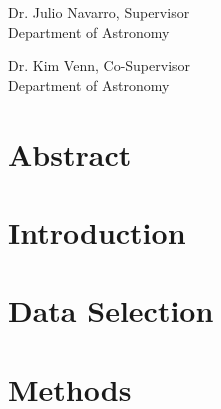 \documentclass[12pt,oneside,letterpaper]{report}
\newcommand{\skipline}{\vspace{\baselineskip}}
\begin{document}
Dr. Julio Navarro, Supervisor\\
Department of Astronomy \\
\skipline

\noindent Dr. Kim Venn, Co-Supervisor\\
Department of Astronomy


\chapter*{Abstract}


% 


\tableofcontents
\listoffigures
\listoftables

%
%
%
%
%
%
%
%
\newpage






\chapter{Introduction}



\chapter{Data Selection}


\chapter{Methods}

\end{document}
